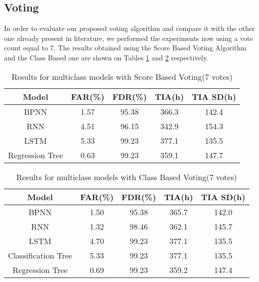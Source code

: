 \subsection{Voting}

In order to evaluate our proposed voting algorithm and compare it with the other one already present in literature, we performed the experiments now using a vote count equal to 7.
The results obtained using the Score Based Voting Algorithm and the Class Based one are shown on Tables \ref{table:results_multiclass_score_multi_vote} and \ref{table:results_multiclass_class_multi_vote} respectively.

\begin{table}
  \begin{center}
    \begin{tabular}{|c|c|c|c|c|}
      \hline
    Model & FAR(\%) & FDR(\%) & TIA(h) & TIA SD(h) \\
    \hline
    BPNN & 1.57 & 95.38 & 366.3 & 142.4 \\
    RNN & 4.51 & 96.15 & 342.9 & 154.3 \\
    LSTM & 5.33 & 99.23 & 377.1 & 135.5 \\
    Regression Tree & 0.63 & 99.23 & 359.1 & 147.7 \\
    \hline
    \end{tabular}
    \caption[Results Multiclass Models, Score Voting, 7 votes]{Results for multiclass models with Score Based Voting(7 votes)}
    \label{table:results_multiclass_score_multi_vote}
  \end{center}
\end{table}

\begin{table}
  \begin{center}
    \begin{tabular}{|c|c|c|c|c|}
      \hline
    Model & FAR(\%) & FDR(\%) & TIA(h) & TIA SD(h) \\
    \hline
    BPNN & 1.50 & 95.38 & 365.7 & 142.0 \\
    RNN & 1.32 & 98.46 & 362.1 & 145.7 \\
    LSTM & 4.70 & 99.23 & 377.1 & 135.5\\
    Classification Tree & 5.33 & 99.23 & 377.1 & 135.5 \\
    Regression Tree & 0.69 & 99.23 & 359.2 & 147.4 \\
    \hline
    \end{tabular}
    \caption[Results Multiclass Models, Class Voting, 7 votes]{Results for multiclass models with Class Based Voting(7 votes)}
    \label{table:results_multiclass_class_multi_vote}
  \end{center}
\end{table}

